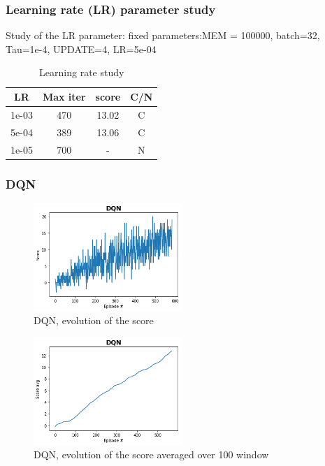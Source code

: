 \documentclass[12pt]{article}
\begin{document}
\subsubsection{Learning rate (LR) parameter study}
Study of the LR parameter:
fixed parameters:MEM = 100000, batch=32, Tau=1e-4, UPDATE=4, LR=5e-04

\begin{table}[!htbp]
\centering
\begin{tabular}{|c|c|c|c|}
\hline
{\textbf{LR}} & {\textbf{Max iter}} & {\textbf{score}} & {\textbf{C/N}} \\ \hline
1e-03  & 470 & 13.02 & C \\ \hline
5e-04  & 389 & 13.06 & C \\ \hline
1e-05  & 700 &   -   & N \\ \hline
\end{tabular}
\caption{Learning rate study}
\label{tab:LR}
\end{table}

\subsubsection{DQN}

\begin{figure}[!htbp]
  \centering
  \includegraphics[width=0.5\textwidth]{../PNG/dqn.png}
  \caption{DQN, evolution of the score}
  \label{fig:DQN}
\end{figure}

\begin{figure}[!htbp]
 \centering
  \includegraphics[width=0.5\textwidth]{../PNG/dqn_smooth.png}
  \caption{DQN, evolution of the score averaged over 100 window}
  \label{fig:DQN_smooth}
\end{figure}
\end{document}
